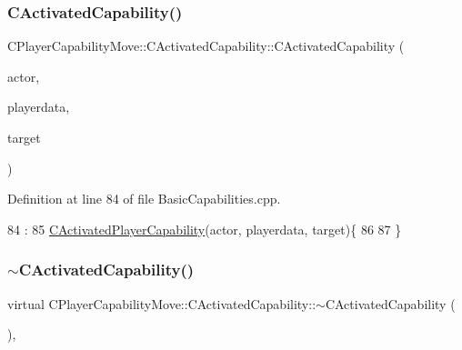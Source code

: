 \subsubsection{\texorpdfstring{C\+Activated\+Capability()}{CActivatedCapability()}}
{\footnotesize\ttfamily C\+Player\+Capability\+Move\+::\+C\+Activated\+Capability\+::\+C\+Activated\+Capability (\begin{DoxyParamCaption}\item[{std\+::shared\+\_\+ptr$<$ \hyperlink{classCPlayerAsset}{C\+Player\+Asset} $>$}]{actor,  }\item[{std\+::shared\+\_\+ptr$<$ \hyperlink{classCPlayerData}{C\+Player\+Data} $>$}]{playerdata,  }\item[{std\+::shared\+\_\+ptr$<$ \hyperlink{classCPlayerAsset}{C\+Player\+Asset} $>$}]{target }\end{DoxyParamCaption})}



Definition at line 84 of file Basic\+Capabilities.\+cpp.


\begin{DoxyCode}
84                                                                                                            
                                                                             :
85 \hyperlink{classCActivatedPlayerCapability_a1ece00ffb6a7b925c84dd94a7407a0d1}{CActivatedPlayerCapability}(actor, playerdata, target)\{
86 
87 \}
\end{DoxyCode}
\hypertarget{classCPlayerCapabilityMove_1_1CActivatedCapability_a32285a6970ff939ebafc8ab9dd84317b}{}\label{classCPlayerCapabilityMove_1_1CActivatedCapability_a32285a6970ff939ebafc8ab9dd84317b} 
\subsubsection{\texorpdfstring{$\sim$\+C\+Activated\+Capability()}{~CActivatedCapability()}}
{\footnotesize\ttfamily virtual C\+Player\+Capability\+Move\+::\+C\+Activated\+Capability\+::$\sim$\+C\+Activated\+Capability (\begin{DoxyParamCaption}{ }\end{DoxyParamCaption})\hspace{0.3cm}{\ttfamily [inline]}, {\ttfamily [virtual]}}



